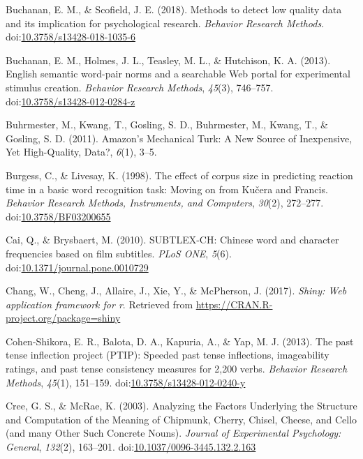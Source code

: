 \documentclass[english,man]{apa6}
\theoremstyle{definition}
\theoremstyle{definition}
\theoremstyle{definition}
\theoremstyle{remark}
\begin{document}
\hypertarget{ref-Buchanan2018}{}
Buchanan, E. M., \& Scofield, J. E. (2018). Methods to detect low
quality data and its implication for psychological research.
\emph{Behavior Research Methods}.
doi:\href{https://doi.org/10.3758/s13428-018-1035-6}{10.3758/s13428-018-1035-6}

\hypertarget{ref-Buchanan2013}{}
Buchanan, E. M., Holmes, J. L., Teasley, M. L., \& Hutchison, K. A.
(2013). English semantic word-pair norms and a searchable Web portal for
experimental stimulus creation. \emph{Behavior Research Methods},
\emph{45}(3), 746--757.
doi:\href{https://doi.org/10.3758/s13428-012-0284-z}{10.3758/s13428-012-0284-z}

\hypertarget{ref-Buhrmester2011}{}
Buhrmester, M., Kwang, T., Gosling, S. D., Buhrmester, M., Kwang, T., \&
Gosling, S. D. (2011). Amazon's Mechanical Turk: A New Source of
Inexpensive, Yet High-Quality, Data?, \emph{6}(1), 3--5.

\hypertarget{ref-Burgess1998}{}
Burgess, C., \& Livesay, K. (1998). The effect of corpus size in
predicting reaction time in a basic word recognition task: Moving on
from Kučera and Francis. \emph{Behavior Research Methods, Instruments,
and Computers}, \emph{30}(2), 272--277.
doi:\href{https://doi.org/10.3758/BF03200655}{10.3758/BF03200655}

\hypertarget{ref-Cai2010}{}
Cai, Q., \& Brysbaert, M. (2010). SUBTLEX-CH: Chinese word and character
frequencies based on film subtitles. \emph{PLoS ONE}, \emph{5}(6).
doi:\href{https://doi.org/10.1371/journal.pone.0010729}{10.1371/journal.pone.0010729}

\hypertarget{ref-R-shiny}{}
Chang, W., Cheng, J., Allaire, J., Xie, Y., \& McPherson, J. (2017).
\emph{Shiny: Web application framework for r}. Retrieved from
\url{https://CRAN.R-project.org/package=shiny}

\hypertarget{ref-Cohen-Shikora2013}{}
Cohen-Shikora, E. R., Balota, D. A., Kapuria, A., \& Yap, M. J. (2013).
The past tense inflection project (PTIP): Speeded past tense
inflections, imageability ratings, and past tense consistency measures
for 2,200 verbs. \emph{Behavior Research Methods}, \emph{45}(1),
151--159.
doi:\href{https://doi.org/10.3758/s13428-012-0240-y}{10.3758/s13428-012-0240-y}

\hypertarget{ref-Cree2003}{}
Cree, G. S., \& McRae, K. (2003). Analyzing the Factors Underlying the
Structure and Computation of the Meaning of Chipmunk, Cherry, Chisel,
Cheese, and Cello (and many Other Such Concrete Nouns). \emph{Journal of
Experimental Psychology: General}, \emph{132}(2), 163--201.
doi:\href{https://doi.org/10.1037/0096-3445.132.2.163}{10.1037/0096-3445.132.2.163}
\end{document}
